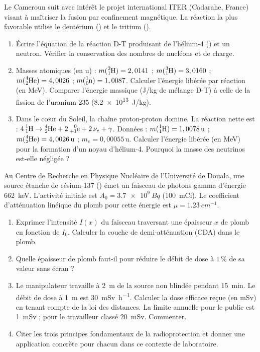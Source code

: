 \documentclass[11pt]{article}
\begin{document}
\begin{exercice}
Le Cameroun suit avec intérêt le projet international ITER (Cadarahe, France) visant à maîtriser la fusion par confinement magnétique. La réaction la plus favorable utilise le deutérium () et le tritium ().
\begin{enumerate}
    \item Écrire l'équation de la réaction D-T produisant de l'hélium-4 () et un neutron. Vérifier la conservation des nombres de nucléons et de charge.
    \item Masses atomiques (en u) : $m(\ce{^{2}_{1}H}) = 2,0141$ ; $m(\ce{^{3}_{1}H}) = 3,0160$ ; $m(\ce{^{4}_{2}He}) = 4,0026$ ; $m(\ce{^{1}_{0}n}) = 1,0087$.
        Calculer l'énergie libérée par réaction (en MeV). Comparer l'énergie massique (J/kg de mélange D-T) à celle de la fission de l'uranium-235 (\SI{8,2e13}{J/kg}).
    \item Dans le cœur du Soleil, la chaîne proton-proton domine. La réaction nette est : $4\,\ce{^{1}_{1}H} \to \ce{^{4}_{2}He} + 2\,\ce{^{0}_{+1}e} + 2\,\nu_e + \gamma$.
        Données : $m(\ce{^{1}_{1}H}) = 1,0078\,\text{u}$ ; $m(\ce{^{4}_{2}He}) = 4,0026\,\text{u}$ ; $m_e = 0,00055\,\text{u}$.
        Calculer l'énergie libérée (en MeV) pour la formation d'un noyau d'hélium-4. Pourquoi la masse des neutrinos est-elle négligée ?
\end{enumerate}
\end{exercice}

\begin{exercice}
Au Centre de Recherche en Physique Nucléaire de l'Université de Douala, une source étanche de césium-137 () émet un faisceau de photons gamma d'énergie \SI{662}{keV}. L'activité initiale est $A_0 = \SI{3,7e9}{Bq}$ (\SI{100}{mCi}). Le coefficient d'atténuation linéique du plomb pour cette énergie est $\mu = \SI{1,23}{cm^{-1}}$.
\begin{enumerate}
    \item Exprimer l'intensité $I(x)$ du faisceau traversant une épaisseur $x$ de plomb en fonction de $I_0$. Calculer la couche de demi-atténuation (CDA) dans le plomb.
    \item Quelle épaisseur de plomb faut-il pour réduire le débit de dose à $1\,\%$ de sa valeur sans écran ?
    \item Le manipulateur travaille à \SI{2}{m} de la source non blindée pendant \SI{15}{min}. Le débit de dose à \SI{1}{m} est \SI{30}{mSv.h^{-1}}.
        Calculer la dose efficace reçue (en mSv) en tenant compte de la loi des distances. La limite annuelle pour le public est \SI{1}{mSv} ; pour le travailleur classé \SI{20}{mSv}. Commenter.
    \item Citer les trois principes fondamentaux de la radioprotection et donner une application concrète pour chacun dans ce contexte de laboratoire.
\end{enumerate}
\end{exercice}
\end{document}
